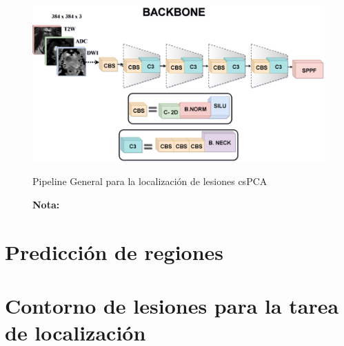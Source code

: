 \begin{figure}[h!]
	\centering
	\caption{Pipeline General para la localización de lesiones csPCA}
	\includegraphics[width=1\textwidth]{imgs/backbone_2.png}
	\label{fig:backbone}
\end{figure}

\begin{figure}[h!]
	\noindent \textbf{Nota:} 
\end{figure}

\par

\newpage
\section{Predicción de regiones}





\par

\newpage
\section{Contorno de lesiones para la tarea de localización}

